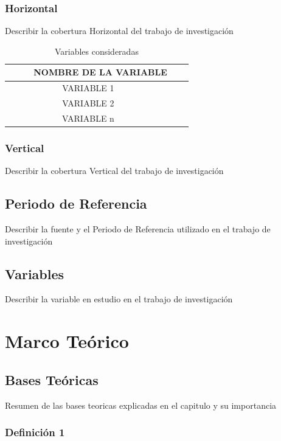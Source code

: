 \documentclass[oneside,11pt]{Latex/Classes/PhDthesisPSnPDF}
\begin{document}
\subsection{Horizontal}

Describir la cobertura Horizontal del trabajo de investigación\\

\begin{table}[ht]
\centering
\caption{Variables consideradas} 
\resizebox{10cm}{!} {
\begin{tabular}{ccc}
  \hline
\ \ \ \ \ NOMBRE DE LA VARIABLE \\ 
  \hline
   VARIABLE 1 \\ 
VARIABLE 2\\ 
VARIABLE n\\ 
   \hline
\end{tabular}
}
\end{table}

\subsection{Vertical}

Describir la cobertura Vertical del trabajo de investigación

\section{Periodo de Referencia}

Describir la fuente y el Periodo de Referencia utilizado en el trabajo
de investigación

\section{Variables}

Describir la variable en estudio en el trabajo de investigación

\chapter{Marco Teórico}

\section{Bases Teóricas}

Resumen de las bases teoricas explicadas en el capitulo y su
importancia\\

\subsection{Definición 1}
\end{document}
